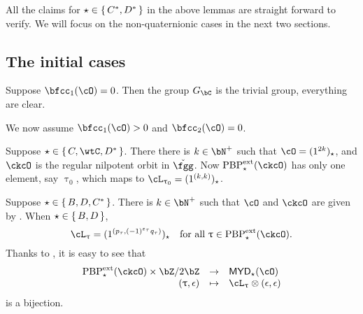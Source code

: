 \documentclass[12pt,a4paper]{amsart}
\def\MYD{{\mathsf{MYD}}}
\def\Forall{\text{for all }}
\numberwithin{equation}{section}
\newtheorem{lem}[thm]{Lemma}
\theoremstyle{remark}
\def\PBPes{\mathrm{PBP}^{\mathrm{ext}}_{\star}}
\begin{document}






All the claims for $\star\in \set{C^{*},D^{*}}$ in the above lemmas are straight forward to verify.
We will focus on the non-quaternionic cases in the next two sections.

\subsection{The initial cases}\label{sec:pfDC.init}
Suppose $\bfcc_{1}(\cO)=0$. Then the group $G_{\bC}$ is the trivial group,
everything are clear.

We now assume $\bfcc_{1}(\cO)>0$ and $\bfcc_{2}(\cO)=0$.

Suppose $\star \in \set{C,\wtC,D^*}$. There there is $k\in\bN^{+}$ such that
$\cO = (1^{2k})_{\star}$, and $\ckcO$ is the regular nilpotent orbit in $\ckfgg$.
Now $\PBPes(\ckcO)$ has only one element, say $\uptau_{0}$, which
maps to $\ac_{\uptau_{0}} = (1^{(k,k)})_{\star}$.

Suppose $\star \in \set{B,D,C^{*}}$. There is $k\in \bN^{+}$ such that
$\cO$ and $\ckcO$ are given by .
When $\star \in \set{B,D}$,
\[
  \ac_{\uptau} = (1^{(p_{\tau},(-1)^{\varepsilon_{\tau}}q_{\tau})})_{\star}
  \quad  \Forall \uptau\in \PBPes(\ckcO).
\]
Thanks to , it is easy to see that
\[
  \begin{array}{rcl}
    \PBPes(\ckcO)\times \bZ/2\bZ & \rightarrow & \MYD_{\star}(\cO)\\
    (\uptau,\epsilon) & \mapsto & \ac_{\uptau}\otimes (\epsilon,\epsilon)
  \end{array}
\]
is a bijection.
\end{document}
